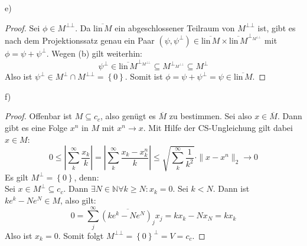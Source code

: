 \documentclass[a4paper,12pt]{article}
\newcommand{\kla}{}
\newcommand{\klammer}{}
\begin{document}
e)
\begin{proof}
Sei $\phi\in M^{\bot\bot}$. Da $\overline{\mathrm{lin\,}M}$ ein abgeschlossener Teilraum von $M^{\bot\bot}$ ist, gibt es nach dem Projektionssatz genau ein Paar $\kla\left( {\psi,\psi^\bot} \right)\in\overline{\mathrm{lin\,}M}\times\overline{\mathrm{lin\,}M}^{\bot_{M^{\bot\bot}}}$ mit $\phi=\psi+\psi^\bot$. Wegen (b) gilt weiterhin:
$$\psi^\bot\in\overline{\mathrm{lin\,}M}^{\bot_{M^{\bot\bot}}}\subseteq M^{\bot_{M^{\bot\bot}}}\subseteq M^\bot$$
Also ist $\psi^\bot\in M^\bot\cap M^{\bot\bot}=\klammer\left\{ {0} \right\}$. Somit ist $\phi=\psi+\psi^\bot=\psi\in\overline{\mathrm{lin\,}M}$.
\end{proof}
f)
\begin{proof}
Offenbar ist $M\subseteq c_c$, also genügt es $\overline{M}$ zu bestimmen. Sei also $x\in \overline{M}$. Dann gibt es eine Folge $x^n$ in $M$ mit $x^n\rightarrow x$. Mit Hilfe der CS-Ungleichung gilt dabei $x\in M$:
$$0\le\left\vert\sum_k^\infty\frac{x_k}{k}\right\vert=\left\vert\sum_k^\infty\frac{x_k-x_k^n}{k}\right\vert\le\sqrt{\sum_k^\infty\frac{1}{k^2}}\cdot\|x-x^n\|_2\rightarrow 0$$
Es gilt $M^\bot=\klammer\left\{ {0} \right\}$, denn:\\
Sei $x\in M^\bot\subseteq c_c$. Dann $\exists N\in\mathbb{N}\forall k\ge N:x_k=0$. Sei $k<N$. Dann ist $ke^k-Ne^N\in M$, also gilt:
$$0=\sum_j^\infty\overline{(ke^k-Ne^N)_j}x_j=kx_k-Nx_N=kx_k$$
Also ist $x_k=0$. Somit folgt $M^{\bot\bot}=\klammer\left\{ {0} \right\}^\bot=V=c_c$.
\end{proof}
\end{document}
